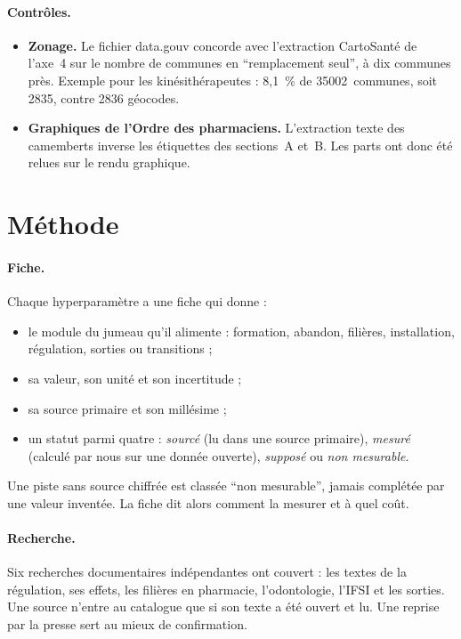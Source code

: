 \documentclass[11pt]{article}
\begin{document}
\paragraph{Contrôles.}
\begin{itemize}
\item \textbf{Zonage.} Le fichier data.gouv concorde avec l'extraction
  CartoSanté de l'axe~4 sur le nombre de communes en \enquote{remplacement
  seul}, à dix communes près\derive. Exemple pour les kinésithérapeutes :
  8,1~\% de \num{35002}~communes, soit \num{2835}\derive{}, contre
  \num{2836}\mesure{} géocodes.
\item \textbf{Graphiques de l'Ordre des pharmaciens.} L'extraction texte
  des camemberts inverse les étiquettes des sections~A et~B. Les parts ont
  donc été relues sur le rendu graphique.
\end{itemize}

\section{Méthode}

\paragraph{Fiche.}
Chaque hyperparamètre a une fiche qui donne :
\begin{itemize}
\item le module du jumeau qu'il alimente : formation, abandon, filières,
  installation, régulation, sorties ou transitions ;
\item sa valeur, son unité et son incertitude ;
\item sa source primaire et son millésime ;
\item un statut parmi quatre : \emph{sourcé} (lu dans une source
  primaire), \emph{mesuré} (calculé par nous sur une donnée ouverte),
  \emph{supposé} ou \emph{non mesurable}.
\end{itemize}
Une piste sans source chiffrée est classée \enquote{non mesurable}, jamais
complétée par une valeur inventée. La fiche dit alors comment la mesurer et
à quel coût.

\paragraph{Recherche.}
Six recherches documentaires indépendantes ont couvert : les textes de la
régulation, ses effets, les filières en pharmacie, l'odontologie, l'IFSI et
les sorties. Une source n'entre au catalogue que si son texte a été ouvert
et lu. Une reprise par la presse sert au mieux de confirmation.
\end{document}
